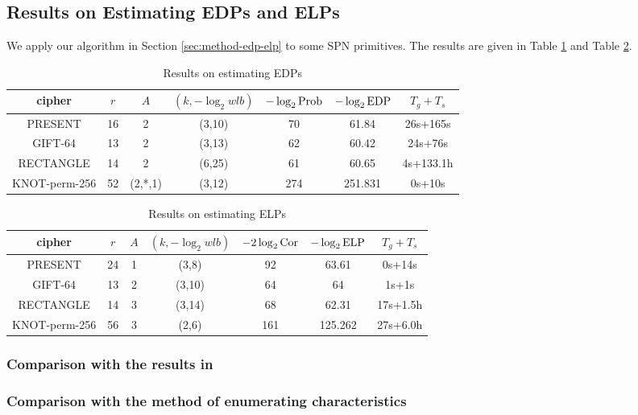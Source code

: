 \subsection{Results on Estimating EDPs and ELPs}

We apply our algorithm in Section \ref{sec:method-edp-elp} to some SPN primitives. The results are given in Table \ref{tab:EDP} and Table \ref{tab:ELP}. 

\begin{table}
	\caption{Results on estimating EDPs}\label{tab:EDP}
	\centering
	\begin{tabular}{|c|c|c|c|c|c|c|}
		\hline
		cipher & $r$ & $A$ & $(k,-\log_2wlb)$ & $-\log_2\text{Prob}$ & $-\log_2\text{EDP}$ & $T_g+T_s$ \\
		\hline
		PRESENT & 16 & 2 & (3,10) & 70 & 61.84 & 26s+165s\\
		\hline
		GIFT-64 & 13 & 2 & (3,13) & 62 & 60.42 & 24s+76s\\
		\hline 
		RECTANGLE & 14 & 2 & (6,25) & 61 & 60.65 & 4s+133.1h \\
		\hline
		KNOT-perm-256 & 52 & (2,*,1) & (3,12) & 274 & 251.831 & 0s+10s\\
		\hline
	\end{tabular}
\end{table}

\begin{table}
	\caption{Results on estimating ELPs}\label{tab:ELP}
	\centering
	\begin{tabular}{|c|c|c|c|c|c|c|}
		\hline
		cipher & $r$ & $A$ & $(k,-\log_2wlb)$ & $-2\log_2\text{Cor}$ & $-\log_2\text{ELP}$ & $T_g+T_s$ \\
		\hline
		PRESENT & 24 & 1 & (3,8) & 92 & 63.61 & 0s+14s\\
		\hline
		GIFT-64 & 13 & 2 & (3,10) & 64 & 64 & 1s+1s\\
		\hline 
		RECTANGLE & 14 & 3 & (3,14) & 68 & 62.31 & 17s+1.5h \\
		\hline
		KNOT-perm-256 & 56 & 3 & (2,6) & 161 & 125.262 & 27s+6.0h\\
		\hline
	\end{tabular}
\end{table}

\subsubsection{Comparison with the results in \cite{EPRINT:HalVej18}}

\subsubsection{Comparison with the method of enumerating characteristics}

